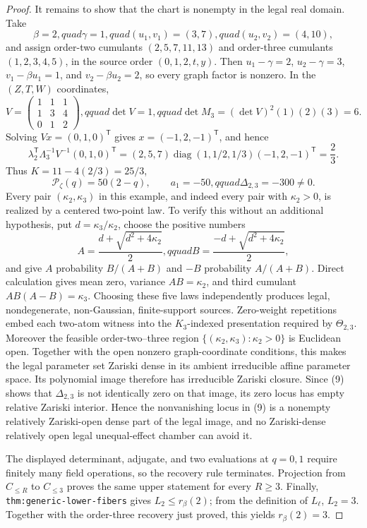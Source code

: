 \documentclass{article}
\begin{document}
\begin{proof}
It remains to show that the chart is nonempty in the legal real domain.  Take
\[
 \beta=2,quad\gamma=1,quad (u_1,v_1)=(3,7),quad (u_2,v_2)=(4,10),
\]
and assign order-two cumulants \((2,5,7,11,13)\) and order-three cumulants \((1,2,3,4,5)\), in the source order \((0,1,2,t,y)\).  Then \(u_1-\gamma=2\), \(u_2-\gamma=3\), \(v_1-\beta u_1=1\), and \(v_2-\beta u_2=2\), so every graph factor is nonzero.  In the \((Z,T,W)\) coordinates,
\[
 V=\begin{pmatrix}1&1&1\\1&3&4\\0&1&2\end{pmatrix},qquad
 \det V=1,qquad \det M_3=(\det V)^2(1)(2)(3)=6.
\]
Solving \(Vx=(0,1,0)^{\mathsf T}\) gives \(x=(-1,2,-1)^{\mathsf T}\), and hence
\[
 \lambda_2^{\mathsf T}\Lambda_3^{-1}V^{-1}(0,1,0)^{\mathsf T}
 =(2,5,7)\operatorname{diag}(1,1/2,1/3)(-1,2,-1)^{\mathsf T}
 =\frac23.
\]
Thus \(K=11-4(2/3)=25/3\),
\[
 \mathcal P_\zeta(q)=50(2-q),\qquad a_1=-50,qquad
 \Delta_{2,3}=-300\ne0. \tag{9}
\]
Every pair \((\kappa_2,\kappa_3)\) in this example, and indeed every pair with \(\kappa_2>0\), is realized by a centered two-point law.  To verify this without an additional hypothesis, put \(d=\kappa_3/\kappa_2\), choose the positive numbers
\[
 A=\frac{d+\sqrt{d^2+4\kappa_2}}2,qquad
 B=\frac{-d+\sqrt{d^2+4\kappa_2}}2,
\]
and give \(A\) probability \(B/(A+B)\) and \(-B\) probability \(A/(A+B)\).  Direct calculation gives mean zero, variance \(AB=\kappa_2\), and third cumulant \(AB(A-B)=\kappa_3\).  Choosing these five laws independently produces legal, nondegenerate, non-Gaussian, finite-support sources.  Zero-weight repetitions embed each two-atom witness into the \(K_3\)-indexed presentation required by \(\Theta_{2,3}\).  Moreover the feasible order-two--three region \(\{(\kappa_2,\kappa_3):\kappa_2>0\}\) is Euclidean open.  Together with the open nonzero graph-coordinate conditions, this makes the legal parameter set Zariski dense in its ambient irreducible affine parameter space.  Its polynomial image therefore has irreducible Zariski closure.  Since (9) shows that \(\Delta_{2,3}\) is not identically zero on that image, its zero locus has empty relative Zariski interior.  Hence the nonvanishing locus in (9) is a nonempty relatively Zariski-open dense part of the legal image, and no Zariski-dense relatively open legal unequal-effect chamber can avoid it.

The displayed determinant, adjugate, and two evaluations at \(q=0,1\) require finitely many field operations, so the recovery rule terminates.  Projection from \(C_{\le R}\) to \(C_{\le3}\) proves the same upper statement for every \(R\ge3\).  Finally, \texttt{thm:generic-lower-fibers} gives \(L_2\le r_\beta(2)\); from the definition of \(L_\ell\), \(L_2=3\).  Together with the order-three recovery just proved, this yields \(r_\beta(2)=3\).
\end{proof}
\end{document}
